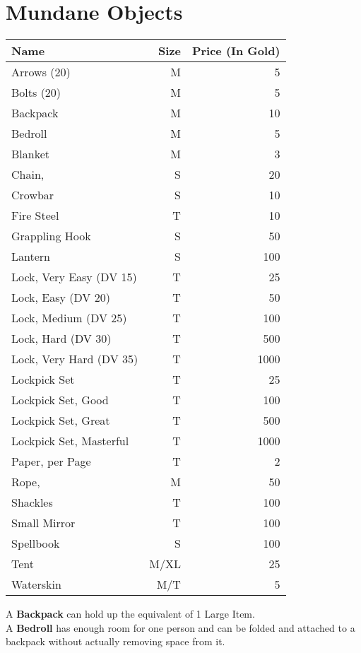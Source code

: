 \section{Mundane Objects}
\begin{longtable}{l | r | r}
	Name & Size & Price (In Gold)\\ \hline
	Arrows (20) & M & 5\\
	Bolts (20) & M & 5\\
	Backpack & M & 10\\
	Bedroll & M & 5\\
	Blanket & M & 3\\
	Chain, \passus{2} & S & 20\\
	Crowbar & S & 10\\
	Fire Steel & T & 10\\
	Grappling Hook & S & 50\\
	Lantern & S & 100\\
	Lock, Very Easy (DV 15) & T & 25\\
	Lock, Easy (DV 20) & T & 50\\
	Lock, Medium (DV 25) & T & 100\\
	Lock, Hard (DV 30) & T & 500\\
	Lock, Very Hard (DV 35) & T & 1000\\
	Lockpick Set & T & 25\\
	Lockpick Set, Good & T & 100\\
	Lockpick Set, Great & T & 500\\
	Lockpick Set, Masterful & T & 1000\\
	Paper, per Page & T & 2\\
	Rope, \passus{10} & M & 50\\
	Shackles & T & 100\\
	Small Mirror & T & 100\\
	Spellbook & S & 100\\
	Tent & M/XL & 25\\
	Waterskin & M/T & 5\\
\end{longtable}



A \textbf{Backpack} can hold up the equivalent of 1 Large Item.\\

A \textbf{Bedroll} has enough room for one person and can be folded and attached to a backpack without actually removing space from it.\\

